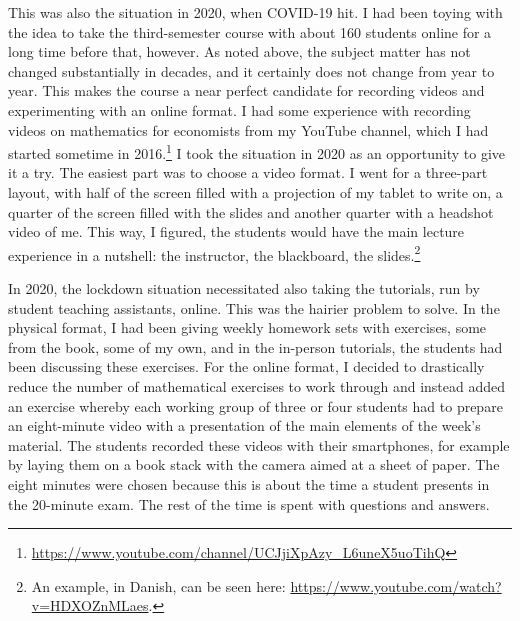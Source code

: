 \documentclass[graybox]{svmult}
\begin{document}
This was also the situation in 2020, when COVID-19 hit. I had been toying with the idea to take the third-semester course with about 160 students online for a long time before that, however. As noted above, the subject matter has not changed substantially in decades, and it certainly does not change from year to year. This makes the course a near perfect candidate for recording videos and experimenting with an online format. I had some experience with recording videos on mathematics for economists from my YouTube channel, which I had started sometime in 2016.\footnote{\url{https://www.youtube.com/channel/UCJjiXpAzy_L6uneX5uoTihQ}} I took the situation in 2020 as an opportunity to give it a try. The easiest part was to choose a video format. I went for a three-part layout, with half of the screen filled with a projection of my tablet to write on, a quarter of the screen filled with the slides and another quarter with a headshot video of me. This way, I figured, the students would have the main lecture experience in a nutshell: the instructor, the blackboard, the slides.\footnote{An example, in Danish, can be seen here: \url{https://www.youtube.com/watch?v=HDXOZnMLaes}.}

In 2020, the lockdown situation necessitated also taking the tutorials, run by student teaching assistants, online. This was the hairier problem to solve. In the physical format, I had been giving weekly homework sets with exercises, some from the book, some of my own, and in the in-person tutorials, the students had been discussing these exercises. For the online format, I decided to drastically reduce the number of mathematical exercises to work through and instead added an exercise whereby each working group of three or four students had to prepare an eight-minute video with a presentation of the main elements of the week's material. The students recorded these videos with their smartphones, for example by laying them on a book stack with the camera aimed at a sheet of paper. The eight minutes were chosen because this is about the time a student presents in the 20-minute exam. The rest of the time is spent with questions and answers. 
\end{document}
